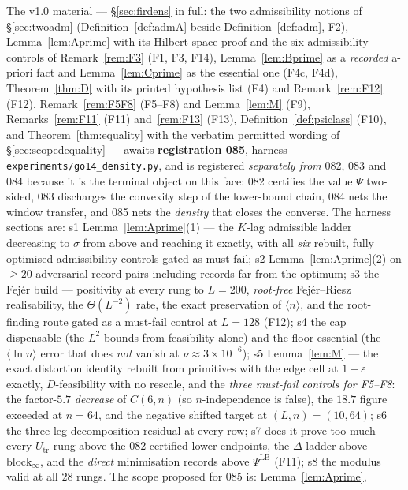 \documentclass[11pt]{article}
\theoremstyle{definition}
\theoremstyle{remark}
\begin{document}
The v1.0 material --- \S\ref{sec:firdens} in full: the two admissibility
notions of \S\ref{sec:twoadm} (Definition~\ref{def:admA} beside
Definition~\ref{def:adm}, F2), Lemma~\ref{lem:Aprime} with its Hilbert-space
proof and the six admissibility controls of Remark~\ref{rem:F3} (F1, F3,
F14), Lemma~\ref{lem:Bprime} as a \emph{recorded} a-priori fact and
Lemma~\ref{lem:Cprime} as the essential one (F4c, F4d),
Theorem~\ref{thm:D} with its printed hypothesis list (F4) and
Remark~\ref{rem:F12} (F12), Remark~\ref{rem:F5F8} (F5--F8) and
Lemma~\ref{lem:M} (F9), Remarks~\ref{rem:F11} (F11) and~\ref{rem:F13} (F13),
Definition~\ref{def:psiclass} (F10), and
Theorem~\ref{thm:equality} with the verbatim permitted wording of
\S\ref{sec:scopedequality} --- awaits \textbf{registration 085}, harness
\texttt{experiments/go14\_density.py}, and is registered \emph{separately
from} 082, 083 and 084 because it is the terminal object on this face: 082
certifies the value $\Psi$ two-sided, 083 discharges the convexity step of
the lower-bound chain, 084 nets the window transfer, and 085 nets the
\emph{density} that closes the converse. The harness sections are: s1
Lemma~\ref{lem:Aprime}(1) --- the $K$-lag admissible ladder decreasing to
$\sigma$ from above and reaching it exactly, with all \emph{six} rebuilt,
fully optimised admissibility controls gated as must-fail; s2
Lemma~\ref{lem:Aprime}(2) on $\ge20$ adversarial record pairs including
records far from the optimum; s3 the Fej\'er build --- positivity at every
rung to $L=200$, \emph{root-free} Fej\'er--Riesz realisability, the
$\Theta(L^{-2})$ rate, the exact preservation of $\langle n\rangle$, and the
root-finding route gated as a must-fail control at $L=128$ (F12); s4 the cap
dispensable (the $L^2$ bounds from feasibility alone) and the floor
essential (the $\langle\ln n\rangle$ error that does \emph{not} vanish at
$\nu\approx3\times10^{-6}$); s5 Lemma~\ref{lem:M} --- the exact distortion
identity rebuilt from primitives with the edge cell at $1+\varepsilon$
exactly, $D$-feasibility with no rescale, and the \emph{three must-fail
controls for F5--F8}: the factor-$5.7$ \emph{decrease} of $C(6,n)$ (so
$n$-independence is false), the $18.7$ figure exceeded at $n=64$, and the
negative shifted target at $(L,n)=(10,64)$; s6 the three-leg decomposition
residual at every row; s7 does-it-prove-too-much --- every
$U_{\mathrm{tr}}$ rung above the 082 certified lower endpoints, the
$\Delta$-ladder above $\mathrm{block}_\infty$, and the \emph{direct}
minimisation records above $\Psi^{\mathrm{LB}}$ (F11); s8 the modulus valid
at all $28$ rungs. The scope proposed for 085 is: Lemma~\ref{lem:Aprime},
\end{document}
